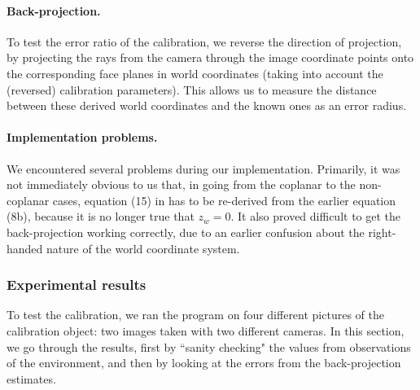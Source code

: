\paragraph{Back-projection.}
To test the error ratio of the calibration, we reverse the direction
of projection, by projecting the rays from the camera through the
image coordinate points onto the corresponding face planes in world
coordinates (taking into account the (reversed) calibration
parameters). This allows us to measure the distance between these
derived world coordinates and the known ones as an error radius.

\paragraph{Implementation problems.}
We encountered several problems during our implementation. Primarily,
it was not immediately obvious to us that, in going from the coplanar
to the non-coplanar cases, equation (15) in \cite{TSAI} has to be
re-derived from the earlier equation (8b), because it is no longer
true that $z_w=0$. It also proved difficult to get the back-projection
working correctly, due to an earlier confusion about the right-handed nature of the world coordinate system.

\subsubsection{Experimental results}
To test the calibration, we ran the program on four different
pictures of the calibration object: two images taken with two different cameras.
In this section, we go through the results, first by ``sanity
checking" the values from observations of the environment, and then
by looking at the errors from the back-projection estimates.

